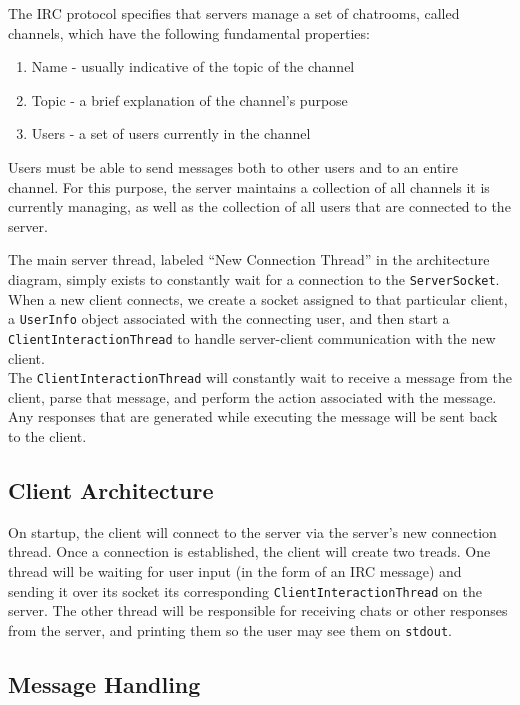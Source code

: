 \documentclass{article}
\begin{document}
The IRC protocol specifies that servers manage a set of chatrooms, called channels,
which have the following fundamental properties:
\begin{enumerate}
    \item
        Name - usually indicative of the topic of the channel
    \item
        Topic - a brief explanation of the channel's purpose
    \item
        Users - a set of users currently in the channel
\end{enumerate}

Users must be able to send messages both to other users and to an entire channel.
For this purpose, the server maintains a collection of all channels it is currently
managing, as well as the collection of all users that are connected to the server.

The main server thread, labeled ``New Connection Thread'' in the architecture diagram,
simply exists to constantly wait for a connection to the \texttt{ServerSocket}.  When
a new client connects, we create a socket assigned to that particular client, a \texttt{UserInfo}
object associated with the connecting user, and then start a \texttt{ClientInteractionThread}
to handle server-client communication with the new client.
\\

The \texttt{ClientInteractionThread} will constantly wait to receive a message from
the client, parse that message, and perform the action associated with the message.
Any responses that are generated while executing the message will be sent back to
the client.

\subsection{Client Architecture}

On startup, the client will connect to the server via the server's new connection thread.
Once a connection is established, the client will
create two treads.  One thread will be waiting for user input (in the form of an IRC message)
and sending it over its socket its corresponding \texttt{ClientInteractionThread} on the server.
The other thread will be responsible for receiving chats or other responses from the server, and printing
them so the user may see them on \texttt{stdout}.

\subsection{Message Handling}
\end{document}
